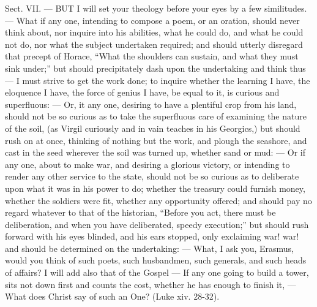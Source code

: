 

Sect. VII. — BUT I will set your theology before your eyes by a few similitudes. — What if any one, intending to compose a poem, or an oration, should never think about, nor inquire into his abilities, what he could do, and what he could not do, nor what the subject undertaken required; and should utterly disregard that precept of Horace, “What the shoulders can sustain, and what they must sink under;” but should precipitately dash upon the undertaking and think thus — I must strive to get the work done; to inquire whether the learning I have, the eloquence I have, the force of genius I have, be equal to it, is curious and superfluous: — Or, it any one, desiring to have a plentiful crop from his land, should not be so curious as to take the superfluous care of examining the nature of the soil, (as Virgil curiously and in vain teaches in his Georgics,) but should rush on at once, thinking of nothing but the work, and plough the seashore, and cast in the seed wherever the soil was turned up, whether sand or mud: — Or if any one, about to make war, and desiring a glorious victory, or intending to render any other service to the state, should not be so curious as to deliberate upon what it was in his power to do; whether the treasury could furnish money, whether the soldiers were fit, whether any opportunity offered; and should pay no regard whatever to that of the historian, “Before you act, there must be deliberation, and when you have deliberated, speedy execution;” but should rush forward with his eyes blinded, and his ears stopped, only exclaiming war! war! and should be determined on the undertaking: — What, I ask you, Erasmus, would you think of such poets, such husbandmen, such generals, and such heads of affairs? I will add also that of the Gospel — If any one going to build a tower, sits not down first and counts the cost, whether he has enough to finish it, — What does Christ say of such an One? (Luke xiv. 28-32).

